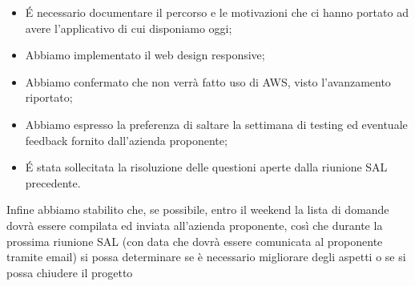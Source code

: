 \begin{itemize}
    \item \'E necessario documentare il percorso e le motivazioni che ci hanno portato ad avere l'applicativo di cui disponiamo oggi;
    \item Abbiamo implementato il web design responsive;
    \item Abbiamo confermato che non verrà fatto uso di AWS, visto l'avanzamento riportato;
    \item Abbiamo espresso la preferenza di saltare la settimana di testing ed eventuale feedback fornito dall'azienda proponente;
    \item \'E stata sollecitata la risoluzione delle questioni aperte dalla riunione SAL precedente.
\end{itemize}
Infine abbiamo stabilito che, se possibile, entro il weekend la lista di domande dovrà essere compilata ed inviata all'azienda proponente, così che durante la prossima riunione SAL (con data che dovrà essere comunicata al proponente tramite email) si possa determinare se è necessario migliorare degli aspetti o se si possa chiudere il progetto